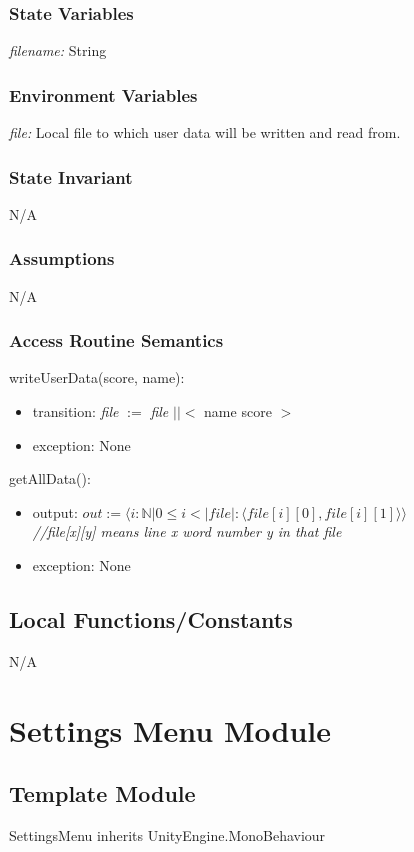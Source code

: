 \documentclass[12pt]{article}
\begin{document}
\subsubsection {State Variables}
\textit{filename:} String

\subsubsection {Environment Variables}
\textit{file:} Local file to which user data will be written and read from.

\subsubsection {State Invariant}
N/A
\subsubsection {Assumptions}
N/A
\subsubsection {Access Routine Semantics}

\noindent writeUserData(score, name):
\begin{itemize}
	\item transition: \textit{file} $:=$ \textit{file} $||<$ name score $>$
	\item exception: None
\end{itemize}

\noindent getAllData():
\begin{itemize}
	\item output: $out:= \langle i: \mathbb{N} | 0 \leq i < |file|: \langle file[i][0], file[i][1] \rangle\rangle$\\\textit{//file[x][y] means line x word number y in that file}
	\item exception: None
\end{itemize}

\subsection{Local Functions/Constants}
N/A

\newpage

\section {Settings Menu Module}

\subsection{Template Module} 
SettingsMenu inherits UnityEngine.MonoBehaviour
\end{document}
